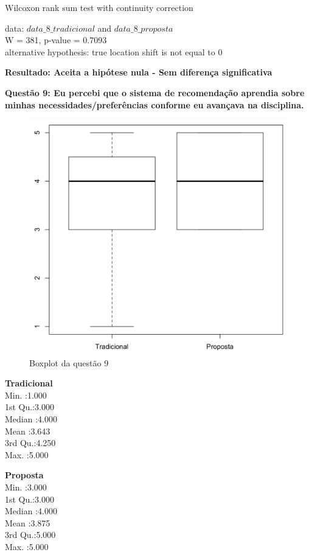 Wilcoxon rank sum test with continuity correction

\noindent
data:  $data\_8\_tradicional$ and $data\_8\_proposta$\\
W = 381, p-value = 0.7093\\
alternative hypothesis: true location shift is not equal to 0

\textbf{Resultado: Aceita a hipótese nula - Sem diferença significativa}

\newpage
\textbf{Questão 9: Eu percebi que o sistema de recomendação aprendia sobre minhas necessidades/preferências conforme eu avançava na disciplina.}

\begin{figure}[htb]
  \caption{\label{fig:questao9-boxplot}Boxplot da questão 9}
  \begin{center}
      \includegraphics[scale=0.4]{./Figuras/questao9-boxplot.png}
  \end{center}
\end{figure}

\begin{multicols}{2}

\noindent\textbf{Tradicional}\\
Min.   :1.000\\
1st Qu.:3.000\\
Median :4.000\\
Mean   :3.643\\
3rd Qu.:4.250\\
Max.   :5.000\\
\columnbreak

\noindent\textbf{Proposta}\\
Min.   :3.000\\
1st Qu.:3.000\\
Median :4.000\\
Mean   :3.875\\
3rd Qu.:5.000\\
Max.   :5.000
\end{multicols}

